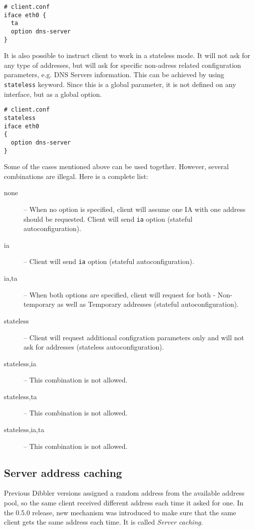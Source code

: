 \begin{lstlisting}
# client.conf
iface eth0 {
  ta
  option dns-server
}
\end{lstlisting}

It is also possible to instruct client to work in a stateless mode. It
will not ask for any type of addresses, but will ask for specific
non-adress related configuration parameters, e.g. DNS Servers
information. This can be achieved by using \verb+stateless+
keyword. Since this is a global parameter, it is not defined on any
interface, but as a global option.

\begin{lstlisting}
# client.conf
stateless
iface eth0
{
  option dns-server
}
\end{lstlisting}

Some of the cases mentioned above can be used together. However,
several combinations are illegal. Here is a complete list:

\begin{description}
\item[none] -- When no option is specified, client will assume one IA
  with one address should be requested. Client will send \verb+ia+
  option (stateful autoconfiguration).
\item[ia] -- Client will send \verb+ia+ option (stateful
  autoconfiguration).
\item[ia,ta] -- When both options are specified, client will request
  for both - Non-temporary as well as Temporary addresses (stateful
  autoconfiguration).
\item[stateless] -- Client will request additional configration
  parameters only and will not ask for addresses (stateless
  autoconfiguration).
\item[stateless,ia] -- This combination is not allowed.
\item[stateless,ta] -- This combination is not allowed.
\item[stateless,ia,ta] -- This combination is not allowed.
\end{description}

\subsection{Server address caching}
Previous Dibbler versions assigned a random address from the available
address pool, so the same client received different address each time it
asked for one. In the 0.5.0 release, new mechanism was introduced
to make sure that the same client gets the same address each time. It is
called \emph{Server caching}.

